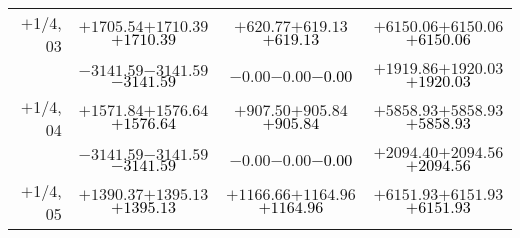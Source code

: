 \documentclass[compress]{beamer}
\begin{document}
\begin{frame}
{\begin{tabular}{r | c | c | c}
$+$1/4, 03 & $+1705.54$\hspace{0.1 cm}$+1710.39$\hspace{0.1 cm}\textcolor{black}{$+1710.39$} & $+620.77$\hspace{0.1 cm}$+619.13$\hspace{0.1 cm}\textcolor{black}{$+619.13$} & $+6150.06$\hspace{0.1 cm}$+6150.06$\hspace{0.1 cm}\textcolor{black}{$+6150.06$} \\
           & $-3141.59$\hspace{0.1 cm}$-3141.59$\hspace{0.1 cm}\textcolor{black}{$-3141.59$} & $-0.00$\hspace{0.1 cm}$-0.00$\hspace{0.1 cm}\textcolor{black}{$-0.00$} & $+1919.86$\hspace{0.1 cm}$+1920.03$\hspace{0.1 cm}\textcolor{black}{$+1920.03$} \\
$+$1/4, 04 & $+1571.84$\hspace{0.1 cm}$+1576.64$\hspace{0.1 cm}\textcolor{black}{$+1576.64$} & $+907.50$\hspace{0.1 cm}$+905.84$\hspace{0.1 cm}\textcolor{black}{$+905.84$} & $+5858.93$\hspace{0.1 cm}$+5858.93$\hspace{0.1 cm}\textcolor{black}{$+5858.93$} \\
           & $-3141.59$\hspace{0.1 cm}$-3141.59$\hspace{0.1 cm}\textcolor{black}{$-3141.59$} & $-0.00$\hspace{0.1 cm}$-0.00$\hspace{0.1 cm}\textcolor{black}{$-0.00$} & $+2094.40$\hspace{0.1 cm}$+2094.56$\hspace{0.1 cm}\textcolor{black}{$+2094.56$} \\
$+$1/4, 05 & $+1390.37$\hspace{0.1 cm}$+1395.13$\hspace{0.1 cm}\textcolor{black}{$+1395.13$} & $+1166.66$\hspace{0.1 cm}$+1164.96$\hspace{0.1 cm}\textcolor{black}{$+1164.96$} & $+6151.93$\hspace{0.1 cm}$+6151.93$\hspace{0.1 cm}\textcolor{black}{$+6151.93$} \\

\end{tabular}}
\end{frame}
\end{document}
